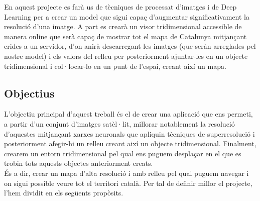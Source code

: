 ﻿\documentclass[10pt,a4paper,twocolumn,twoside]{article}
\begin{document}
En aquest projecte es farà us de tècniques de processat d'imatges i de Deep Learning per a crear un model que sigui capaç d'augmentar significativament la resolució d'una imatge. A part es crearà un visor tridimensional accessible de manera online que serà capaç de mostrar tot el mapa de Catalunya mitjançant crides a un servidor, d'on anirà descarregant les imatges (que seràn arreglades pel nostre model) i els valors del relleu per posteriorment ajuntar-les en un objecte tridimensional i col·locar-lo en un punt de l'espai, creant així un mapa.

\subsection{Objectius}
L'objectiu principal d'aquest treball és el de crear una aplicació que ens permeti, a partir d'un conjunt d'imatges satèl·lit, millorar notablement la resolució d'aquestes mitjançant xarxes neuronals que apliquin tècniques de superresolució i posteriorment afegir-hi un relleu creant així un objecte tridimensional. Finalment, crearem un entorn tridimensional pel qual ens puguem desplaçar en el que es trobin tots aquests objectes anteriorment creats.\\

És a dir, crear un mapa d'alta resolució i amb relleu pel qual puguem navegar i on sigui possible veure tot el territori català. Per tal de definir millor el projecte, l'hem dividit en els següents propòsits.\\
\end{document}

